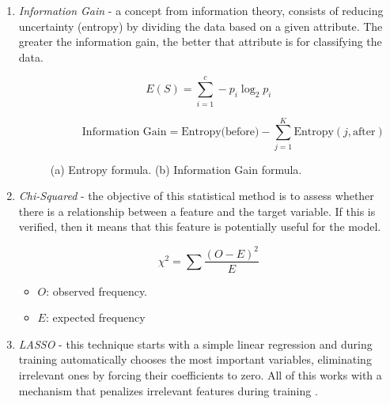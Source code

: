 \begin{enumerate} [label=(\alph*)]
  \item \textit{Information Gain} - a concept from information theory, consists of reducing
        uncertainty (entropy) by dividing the data based on a given attribute. The
        greater the information gain, the better that attribute is for classifying the
        data. \label{item:ig}

        \begin{figure}[h!]
          \centering
          \begin{subfigure}[b]{0.8\textwidth}
            \[
              E(S) = \sum_{i=1}^{c} -p_i \log_2 p_i
            \]
            \caption{}

          \end{subfigure}

          \hfill

          \begin{subfigure}[b]{0.8\textwidth}
            \[
              \text{Information Gain} = \text{Entropy(before)} - \sum_{j=1}^{K} \text{Entropy}(j, \text{after})
            \]
            \caption{}

          \end{subfigure}

          \caption{(a) Entropy formula. (b) Information Gain formula.}
        \end{figure}

  \item \textit{Chi-Squared} - the objective of this statistical method is to
        assess whether there is a relationship between a feature and the target
        variable. If this is verified, then it means that this feature is potentially
        useful for the model. \label{item:qui}

        \label{item:qui}

        \[
          \chi^2 = \sum \frac{(O - E)^2}{E}
        \]

        \begin{itemize}[label=--]
          \item $O$: observed frequency.
          \item $E$: expected frequency
        \end{itemize}

  \item \textit{LASSO} - this technique starts with a simple linear
        regression and during training automatically chooses the most
        important variables, eliminating irrelevant ones by forcing their
        coefficients to zero. All of this works with a mechanism that penalizes
        irrelevant features during training \cite{lasso_paper}.

        \label{item:lasso}

\end{enumerate}

